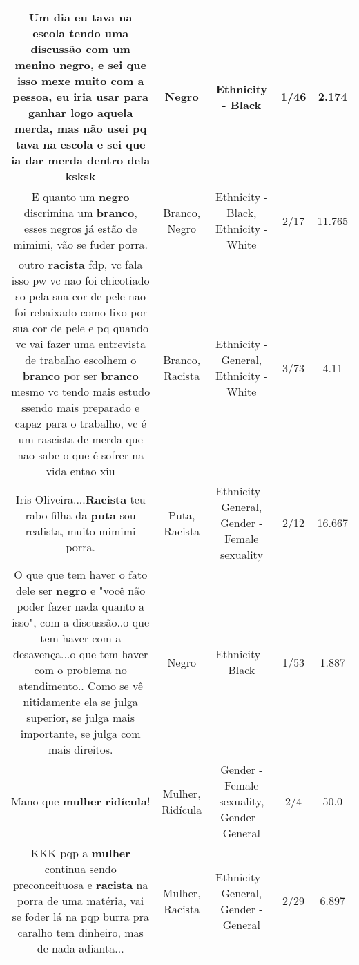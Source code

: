 \documentclass[11pt]{article}
\newlength\mylength
\begin{document}
\begin{center}
\begin{longtable}{|C{.65\mylength}|C{.30\mylength}|C{.12\mylength}|C{.12\mylength}|C{.12\mylength}|}
  \small Um dia eu tava na escola tendo uma discussão com um menino \textbf{negro}, e sei que isso mexe muito com a pessoa, eu iria usar para ganhar logo aquela merda, mas não usei pq tava na escola e sei que ia dar merda dentro dela ksksk\normalsize   & Negro & Ethnicity - Black & 1/46 & 2.174 \\  \hline
  \small E quanto um \textbf{negro} discrimina um \textbf{branco}, esses negros já estão de mimimi, vão se fuder porra.\normalsize   & Branco, Negro & Ethnicity - Black, Ethnicity - White & 2/17 & 11.765 \\  \hline
  \small outro \textbf{racista} fdp, vc fala isso pw vc nao foi chicotiado so pela sua cor de pele nao foi rebaixado como lixo por sua cor de pele e pq quando vc vai fazer uma entrevista de trabalho escolhem o \textbf{branco} por ser \textbf{branco} mesmo vc tendo mais estudo ssendo mais preparado e capaz para o trabalho, vc é um rascista de merda que nao sabe o que é sofrer na vida entao xiu\normalsize   & Branco, Racista & Ethnicity - General, Ethnicity - White & 3/73 & 4.11 \\  \hline
  \small Iris Oliveira....\textbf{Racista} teu rabo filha da \textbf{puta} sou realista, muito mimimi porra.\normalsize   & Puta, Racista & Ethnicity - General, Gender - Female sexuality & 2/12 & 16.667 \\  \hline
  \small O que que tem haver o fato dele ser \textbf{negro} e "você não poder fazer nada quanto a isso", com a discussão..o que tem haver com a desavença...o que tem haver com o problema no atendimento.. Como se vê nitidamente ela se julga superior, se julga mais importante, se julga com mais direitos.\normalsize   & Negro & Ethnicity - Black & 1/53 & 1.887 \\  \hline
  \small Mano que \textbf{mulher} \textbf{ridícula}!\normalsize   & Mulher, Ridícula & Gender - Female sexuality, Gender - General & 2/4 & 50.0 \\  \hline
  \small KKK pqp a \textbf{mulher} continua sendo preconceituosa e \textbf{racista} na porra de uma matéria, vai se foder lá na pqp burra pra caralho tem dinheiro, mas de nada adianta...\normalsize   & Mulher, Racista & Ethnicity - General, Gender - General & 2/29 & 6.897 \\  \hline

\end{longtable}
\end{center}
\end{document}
